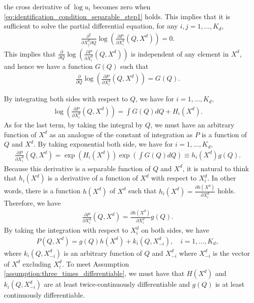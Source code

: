 \documentclass[11pt, a4paper]{article}
\theoremstyle{remark}
\begin{document}
the cross derivative of $\log u_i$ becomes zero when \eqref{eq:identification_condition_separable_step1} holds.
This implies that it is sufficient to solve the partial differential equation, for any $i,j = 1, \ldots, K_d$,
\begin{align}
    \frac{\partial^2 }{\partial X^{d}_j \partial Q}\log \left(\frac{\partial P}{\partial X^{d}_i}(Q, X^{d})\right) = 0.
\end{align}
This implies that $\frac{\partial }{\partial Q}\log \left(\frac{\partial P}{\partial X^{d}_i}(Q, X^{d})\right)$ is independent of any element in $X^{d}$, and hence we have a function $G(Q)$ such that
\begin{align}
    \frac{\partial }{\partial Q}\log \left(\frac{\partial P}{\partial X^{d}_i}(Q, X^{d})\right) = G(Q).
\end{align}

By integrating both sides with respect to $Q$, we have for $i = 1, \ldots, K_d$,
\begin{align}
    \log \left(\frac{\partial P}{\partial X^{d}_i}(Q, X^{d})\right) = \int G(Q) dQ + H_i(X^{d}).
\end{align}
As for the last term, by taking the integral by $Q$, we must have an arbitrary function of $X^{d}$ as an analogue of the constant of integration as $P$ is a function of $Q$ and $X^{d}$.
By taking exponential both side, we have for $i = 1, \ldots, K_d$,
\begin{align}
    \frac{\partial P}{\partial X^{d}_i}(Q, X^{d}) = \exp(H_i(X^{d})) \exp\left(\int G(Q) dQ\right) \equiv h_i(X^{d}) g(Q).
\end{align}
Because this derivative is a separable function of $Q$ and $X^{d}$, it is natural to think that $h_i(X^{d})$ is a derivative of a function of $X^{d}$ with respect to $X^{d}_i$.
In other words, there is a function $h(X^{d})$ of $X^{d}$ such that $h_i(X^{d}) = \frac{\partial h(X^{d})}{\partial X^{d}_i}$ holds.
Therefore, we have
\begin{align}
    \frac{\partial P}{\partial X^{d}_i}(Q, X^{d}) = \frac{\partial h(X^{d})}{\partial X^{d}_i} g(Q).
\end{align}
By taking the integration with respect to $X^{d}_i$ on both sides, we have
\begin{align}
   P(Q, X^{d}) = g(Q) h(X^{d}) + k_i(Q, X^{d}_{-i}), \quad i = 1, \ldots, K_d, \label{eq:inverse_demand_separable_step1}
\end{align}
where $k_i(Q, X^{d}_{-i})$ is an arbitrary function of $Q$ and $X^{d}_{-i}$ where $X^{d}_{-i}$ is the vector of $X^{d}$ excluding $X^{d}_i$.
To meet Assumption \ref{assumption:three_times_differentiable}, we must have that $H(X^{d})$ and $k_i(Q, X^{d}_{-i})$ are at least twice-continuously differentiable and $g(Q)$ is at least continuously differentiable.
\end{document}

